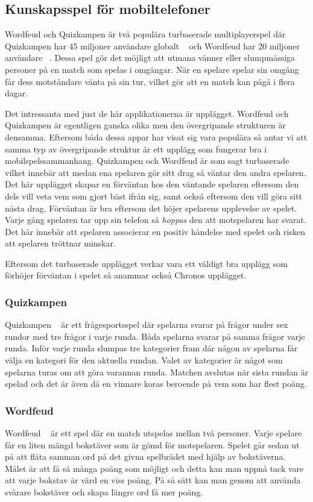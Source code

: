 \documentclass[a4paper, 11pt]{article}
\begin{document}
\subsection{Kunskapsspel för mobiltelefoner}
Wordfeud och Quizkampen är två populära turbaserade multiplayerspel där Quizkampen har 45 miljoner användare globalt ~\cite{quiz} och Wordfeud har 20 miljoner användare ~\cite{wordfeud}. Dessa spel gör det möjligt att utmana vänner eller slumpmässiga personer på en match som spelas i omgångar. När en spelare spelar sin omgång får dess motståndare vänta på sin tur, vilket gör att en match kan pågå i flera dagar.

Det intressanta med just de här applikationerna är upplägget. Wordfeud och Quizkampen är egentligen ganska olika men den övergripande strukturen är densamma. Eftersom båda dessa appar har visat sig vara populära så antar vi att samma typ av övergripande struktur är ett upplägg som fungerar bra i mobilspelssammanhang. Quizkampen och Wordfeud är som sagt turbaserade vilket innebär att medan ena spelaren gör sitt drag så väntar den andra spelaren. Det här upplägget skapar en förväntan hos den väntande spelaren eftersom den dels vill veta vem som gjort bäst ifrån sig, samt också eftersom den vill göra sitt nästa drag. Förväntan är bra eftersom det höjer spelarens upplevelse av spelet. Varje gång spelaren tar upp sin telefon så \textit{hoppas} den att motspelaren har svarat. Det här innebär att spelaren associerar en positiv händelse med spelet och risken att spelaren tröttnar minskar.

Eftersom det turbaserade upplägget verkar vara ett väldigt bra upplägg som förhöjer förväntan i spelet så anammar också Chronos upplägget. 

\subsubsection{Quizkampen}
Quizkampen ~\cite{aboutquiz} är ett frågesportsspel där spelarna svarar på frågor under sex rundor med tre frågor i varje runda. Båda spelarna svarar på samma frågor varje runda.  Inför varje runda slumpas tre kategorier fram där någon av spelarna får välja en kategori för den aktuella rundan. Valet av kategorier är något som spelarna turas om att göra varannan runda. Matchen avslutas när sista rundan är spelad och det är även då en vinnare koras beroende på vem som har flest poäng. 

\subsubsection{Wordfeud}
Wordfeud ~\cite{aboutwordfeud} är ett spel där en match utspelas mellan två personer. Varje spelare får en liten mängd bokstäver som är gömd för motspelaren. Spelet går sedan ut på att fläta samman ord på det givna spelbrädet med hjälp av bokstäverna. Målet är att få så många poäng som möjligt och detta kan man uppnå tack vare att varje bokstav är värd en viss poäng. På så sätt kan man genom att använda svårare bokstäver och skapa längre ord få mer poäng. 
\end{document}
